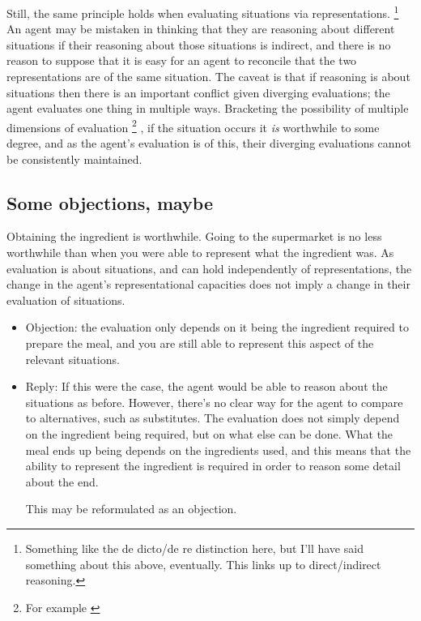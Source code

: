 \documentclass[10pt]{article}
\begin{document}
Still, the same principle holds when evaluating situations via representations.\nolinebreak
\footnote{Something like the de dicto/de re distinction here, but I'll have said something about this above, eventually.
This links up to direct/indirect reasoning.}
An agent may be mistaken in thinking that they are reasoning about different situations if their reasoning about those situations is indirect, and there is no reason to suppose that it is easy for an agent to reconcile that the two representations are of the same situation.
The caveat is that if reasoning is about situations then there is an important conflict given diverging evaluations; the agent evaluates one thing in multiple ways.
Bracketing the possibility of multiple dimensions of evaluation\nolinebreak
\footnote{For example \cite{Dietrich:2013ac}}\nolinebreak
, if the situation occurs it \emph{is} worthwhile to some degree, and as the agent's evaluation is of this, their diverging evaluations cannot be consistently maintained.

\subsection{Some objections, maybe}
\label{sec:some-object-maybe}


Obtaining the ingredient is worthwhile.
Going to the supermarket is no less worthwhile than when you were able to represent what the ingredient was.
As evaluation is about situations, and can hold independently of representations, the change in the agent's representational capacities does not imply a change in their evaluation of situations.

\begin{itemize}
\item Objection: the evaluation only depends on it being the ingredient required to prepare the meal, and you are still able to represent this aspect of the relevant situations.
\item Reply: If this were the case, the agent would be able to reason about the situations as before.
  However, there's no clear way for the agent to compare to alternatives, such as substitutes.
  The evaluation does not simply depend on the ingredient being required, but on what else can be done.
  What the meal ends up being depends on the ingredients used, and this means that the ability to represent the ingredient is required in order to reason some detail about the end.

  This may be reformulated as an objection.
\end{itemize}
\end{document}
